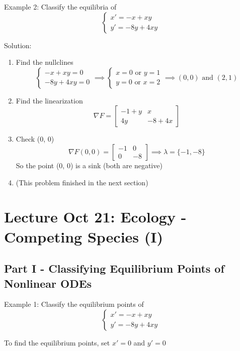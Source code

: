 \documentclass[12pt]{article}
\begin{document}
Example 2: Classify the equilibria of 
\[\begin{cases}
    x' = -x + xy\\
    y' = -8y + 4xy
\end{cases}\]

Solution:
\begin{enumerate}
    \item Find the nullclines 
    \[\begin{cases}
        -x + xy = 0\\
        -8y + 4xy = 0
    \end{cases} \implies \begin{cases}
        x = 0 \text{ or } y = 1\\
        y = 0 \text{ or } x = 2
    \end{cases} \implies (0, 0) \text{ and } (2, 1)\]

    \item Find the linearization
    \[\nabla F = \begin{bmatrix}
        -1 + y & x\\
        4y & -8 + 4x
    \end{bmatrix}\]

    \item Check (0, 0)
    \[\nabla F(0, 0) = \begin{bmatrix}
        -1 & 0\\
        0 & -8
    \end{bmatrix} \implies \lambda = \{-1, -8\}\] 
    So the point (0, 0) is a sink (both are negative)

    \item (This problem finished in the next section)
\end{enumerate}

\section{Lecture Oct 21: Ecology - Competing Species (I)}
\subsection*{Part I - Classifying Equilibrium Points of Nonlinear ODEs}
Example 1: Classify the equilibrium points of
\[\begin{cases}
    x' = -x + xy\\
    y' = -8y + 4xy
\end{cases}\]

To find the equilibrium points, set $x' = 0$ and $y' = 0$
\end{document}
